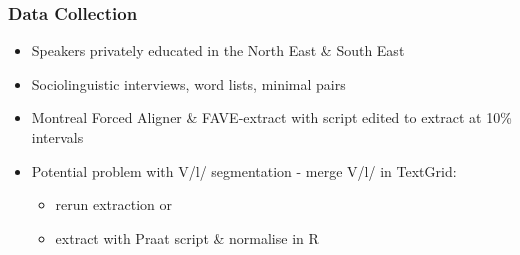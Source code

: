 \documentclass[
xcolor=table,
PHONON=true]
{beamer}
\begin{document}
	\begin{frame}
		\frametitle{Data Collection}
		\begin{itemize}
			\item Speakers privately educated in the North East \& South East
			\pause
			\item Sociolinguistic interviews, word lists, minimal pairs
			\pause
			\item Montreal Forced Aligner \citep{MFA} \& FAVE-extract \citep{FAVE} with script edited to extract at 10\% intervals \cite{Warburton2021}
			\item Potential problem with V/l/ segmentation - merge V/l/ in TextGrid:
			\begin{itemize}
				\item rerun extraction or
				\item extract with Praat script \& normalise in R \citep{vowels}
			\end{itemize}
		\end{itemize}
	\end{frame}
	
	



%	
\end{document}
